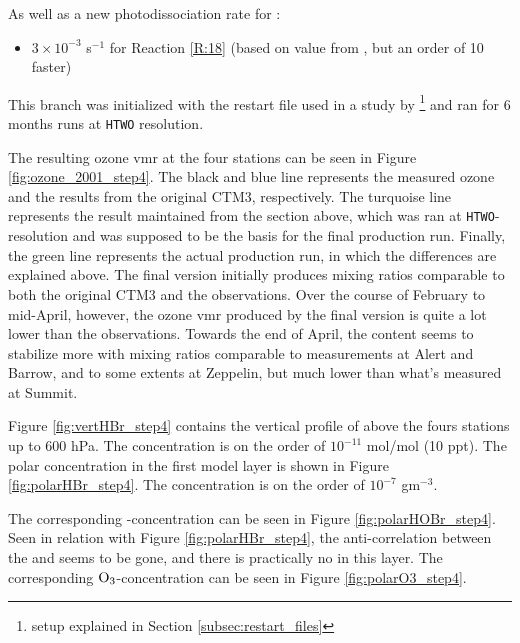 As well as a new photodissociation rate for :

\begin{itemize}
    \item $3\times10^{-3}$ s$^{-1}$ for Reaction \ref{R:18} (based on value from \cite{CAO}, but an order of 10 faster)
\end{itemize}

This branch was initialized with the restart file used in a study by \cite{Falk_2019}\footnote{setup explained in Section \ref{subsec:restart_files}} and ran for 6 months runs at \texttt{HTWO} resolution. 

\medskip

The resulting ozone \acrshort{vmr} at the four stations can be seen in Figure \ref{fig:ozone_2001_step4}. The black and blue line represents the measured ozone and the results from the original CTM3, respectively. The turquoise line represents the result maintained from the section above, which was ran at \texttt{HTWO}-resolution and was supposed to be the basis for the final production run. Finally, the green line represents the actual production run, in which the differences are explained above. The final version initially produces mixing ratios comparable to both the original CTM3 and the observations. Over the course of February to mid-April, however, the ozone \acrshort{vmr} produced by the final version is quite a lot lower than the observations. Towards the end of April, the content seems to stabilize more with mixing ratios comparable to measurements at Alert and Barrow, and to some extents at Zeppelin, but much lower than what's measured at Summit. 



\medskip

Figure \ref{fig:vertHBr_step4} contains the vertical profile of  above the fours stations up to 600 hPa. The concentration is on the order of $10^{-11}$ mol/mol (10 ppt). The polar concentration in the first model layer is shown in Figure \ref{fig:polarHBr_step4}. The concentration is on the order of $10^{-7}$ gm$^{-3}$. 

\medskip






\medskip

The corresponding -concentration can be seen in Figure \ref{fig:polarHOBr_step4}. Seen in relation with Figure \ref{fig:polarHBr_step4}, the anti-correlation between the  and  seems to be gone, and there is practically no  in this layer. The corresponding $\mathrm{O_3}$-concentration can be seen in Figure \ref{fig:polarO3_step4}.

